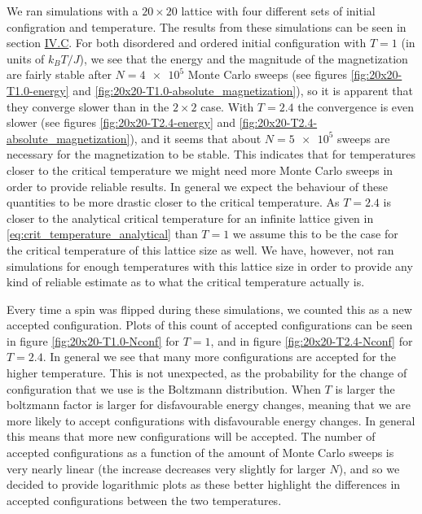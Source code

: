 \documentclass[reprint,english,notitlepage]{revtex4-1}  %
\begin{document}
We ran simulations with a $20 \times 20$ lattice with four different sets of initial configration and temperature. The results from these simulations can be seen in section \hyperref[sec:IV:C]{IV.C}. For both disordered and ordered initial configuration with $T=1$ (in units of $k_B T/J$), we see that the energy and the magnitude of the magnetization are fairly stable after $N=\num{4e5}$ Monte Carlo sweeps (see figures \ref{fig:20x20-T1.0-energy} and \ref{fig:20x20-T1.0-absolute_magnetization}), so it is apparent that they converge slower than in the $2 \times 2$ case. With $T=2.4$ the convergence is even slower (see figures \ref{fig:20x20-T2.4-energy} and \ref{fig:20x20-T2.4-absolute_magnetization}), and it seems that about $N=\num{5e5}$ sweeps are necessary for the magnetization to be stable. This indicates that for temperatures closer to the critical temperature we might need more Monte Carlo sweeps in order to provide reliable results. In general we expect the behaviour of these quantities to be more drastic closer to the critical temperature. As $T=2.4$ is closer to the analytical critical temperature for an infinite lattice given in \eqref{eq:crit_temperature_analytical} than $T=1$ we assume this to be the case for the critical temperature of this lattice size as well. We have, however, not ran simulations for enough temperatures with this lattice size in order to provide any kind of reliable estimate as to what the critical temperature actually is. 

Every time a spin was flipped during these simulations, we counted this as a new accepted configuration. Plots of this count of accepted configurations can be seen in figure \ref{fig:20x20-T1.0-Nconf} for $T=1$, and in figure \ref{fig:20x20-T2.4-Nconf} for $T=2.4$. In general we see that many more configurations are accepted for the higher temperature. This is not unexpected, as the probability for the change of configuration that we use is the Boltzmann distribution. When $T$ is larger the boltzmann factor is larger for disfavourable energy changes, meaning that we are more likely to accept configurations with disfavourable energy changes. In general this means that more new configurations will be accepted. The number of accepted configurations as a function of the amount of Monte Carlo sweeps is very nearly linear (the increase decreases very slightly for larger $N$), and so we decided to provide logarithmic plots as these better highlight the differences in accepted configurations between the two temperatures. 
\end{document}
